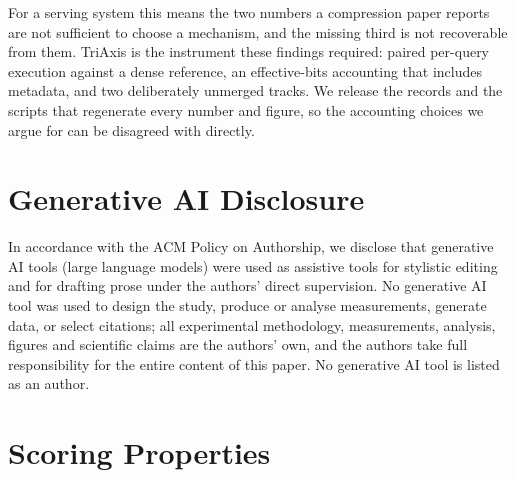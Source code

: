 \documentclass[sigplan,10pt,anonymous,review,nonacm]{acmart}
\newcommand{\sys}{TriAxis}
\begin{document}
For a serving system this means the two numbers a compression paper reports
are not sufficient to choose a mechanism, and the missing third is not
recoverable from them. \sys{} is the instrument these findings required:
paired per-query execution against a dense reference, an effective-bits
accounting that includes metadata, and two deliberately unmerged tracks. We
release the records and the scripts that regenerate every number and figure,
so the accounting choices we argue for can be disagreed with
directly.\label{concend}

\section*{Generative AI Disclosure}
\label{disclosurestart}

In accordance with the ACM Policy on Authorship, we disclose that generative
AI tools (large language models) were used as assistive tools for stylistic
editing and for drafting prose under the authors' direct supervision. No
generative AI tool was used to design the study, produce or analyse
measurements, generate data, or select citations; all experimental
methodology, measurements, analysis, figures and scientific claims are the
authors' own, and the authors take full responsibility for the entire content
of this paper. No generative AI tool is listed as an author.

\label{bodyend}



\appendix

\renewcommand{\topfraction}{0.95}
\renewcommand{\bottomfraction}{0.9}
\renewcommand{\textfraction}{0.05}
\renewcommand{\floatpagefraction}{0.7}
\renewcommand{\dbltopfraction}{0.95}
\renewcommand{\dblfloatpagefraction}{0.7}
\setcounter{topnumber}{4}
\setcounter{bottomnumber}{3}
\setcounter{totalnumber}{6}
\setcounter{dbltopnumber}{4}

\section{Scoring Properties}
\label{app:proofs}
\end{document}
